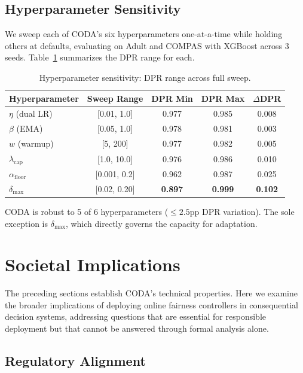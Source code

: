 \documentclass[letterpaper]{article} %
\theoremstyle{definition}
\begin{document}
\subsection{Hyperparameter Sensitivity}

We sweep each of CODA's six hyperparameters one-at-a-time while holding others at defaults, evaluating on Adult and COMPAS with XGBoost across 3 seeds. Table~\ref{tab:sensitivity} summarizes the DPR range for each.

\begin{table}[t]
\centering
\caption{Hyperparameter sensitivity: DPR range across full sweep.}
\label{tab:sensitivity}
\small
\begin{tabular}{@{}lcccc@{}}
\toprule
Hyperparameter & Sweep Range & DPR Min & DPR Max & $\Delta$DPR \\
\midrule
$\eta$ (dual LR) & [0.01, 1.0] & 0.977 & 0.985 & 0.008 \\
$\beta$ (EMA) & [0.05, 1.0] & 0.978 & 0.981 & 0.003 \\
$w$ (warmup) & [5, 200] & 0.977 & 0.982 & 0.005 \\
$\lambda_{\text{cap}}$ & [1.0, 10.0] & 0.976 & 0.986 & 0.010 \\
$\alpha_{\text{floor}}$ & [0.001, 0.2] & 0.962 & 0.987 & 0.025 \\
\midrule
$\delta_{\max}$ & [0.02, 0.20] & \textbf{0.897} & \textbf{0.999} & \textbf{0.102} \\
\bottomrule
\end{tabular}
\end{table}

CODA is robust to 5 of 6 hyperparameters ($\leq 2.5$pp DPR variation). The sole exception is $\delta_{\max}$, which directly governs the capacity for adaptation.

\section{Societal Implications}
\label{sec:societal}

The preceding sections establish CODA's technical properties. Here we examine the broader implications of deploying online fairness controllers in consequential decision systems, addressing questions that are essential for responsible deployment but that cannot be answered through formal analysis alone.

\subsection{Regulatory Alignment}
\end{document}
